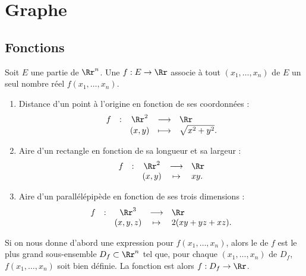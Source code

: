 \documentclass[11pt, class=report,crop=false]{standalone}
\begin{document}
\section{Graphe}

\subsection{Fonctions }

\begin{definition}
Soit $E$ une partie de $\Rr^n$. 
Une  $f : E \to \Rr$ associe à tout 
$(x_1,\ldots,x_n)$ de $E$ un seul nombre réel $f(x_1,\ldots,x_n)$.
\end{definition}

\begin{exemple}
\sauteligne
\begin{enumerate}
\item Distance d'un point à l'origine en fonction de ses coordonnées :
$$\begin{array}{ccccl}f&:&\Rr^2&\longrightarrow &\Rr\\ &&(x,y)&\longmapsto &\sqrt{x^2+y^2}.\end{array}$$
\item Aire d'un rectangle en fonction de sa longueur et sa largeur :
$$\begin{array}{ccccl}f&:&\Rr^2&\longrightarrow &\Rr\\ &&(x,y)&\mapsto &xy.\end{array}$$
\item Aire d'un parallélépipède en fonction de ses trois dimensions :
$$\begin{array}{ccccl}f&:&\Rr^3&\longrightarrow &\Rr\\ &&(x,y,z)&\mapsto &2(xy+yz+xz).\end{array}$$
\end{enumerate}
\end{exemple}



\begin{definition}
Si on nous donne d'abord une expression pour $f(x_1,\ldots,x_n)$,  alors le  de $f$ est le plus grand sous-ensemble $D_f \subset \Rr^n$ tel que, pour chaque $(x_1,\ldots,x_n)$ de $D_f$, $f(x_1,\ldots,x_n)$ soit bien définie. La fonction est alors $f : D_f \to \Rr$.
\end{definition}
\end{document}
